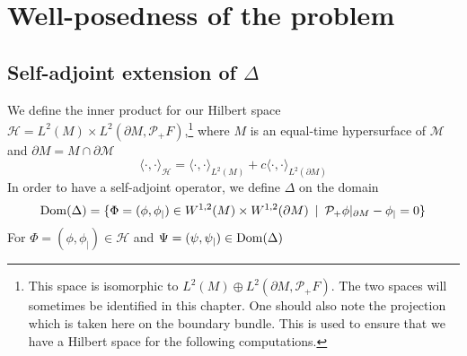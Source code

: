 \section{Well-posedness of the problem}\label{wen-sect-saw}
\subsection{Self-adjoint extension of $\Delta$}
We define the inner product for our Hilbert space $\mathcal{H} = L^{2}(M)\times L^{2}(\partial M, \mathcal{P}_+ F)$,\footnote{
This space is isomorphic to 
$L^2(M)\oplus L^2(\partial M, \mathcal{P}_+ F)$.
The two spaces will sometimes be identified in this chapter.
One should also note the projection which is taken here on the boundary bundle.
This is used to ensure that we have a Hilbert space for the following computations.
}
where $M$ is an equal-time hypersurface of $\mathcal{M}$ and $\partial M = M\cap \partial \mathcal{M}$
\begin{equation}\label{wen-innerpdt}
\langle \cdot, \cdot \rangle _\mathcal{H} = \langle \cdot, \cdot \rangle _{L^2(M)} + c \langle \cdot, \cdot \rangle _{L^2(\partial M)}
\end{equation}
In order to have a self-adjoint operator, we define $\Delta$ on the domain
\begin{equation*}
\mathrm{Dom}( \Delta) = \{ \Phi = (\phi, \phi_|) \in W^{1,2}(M)\times W^{1,2}(
\partial M)\enskip | \enskip \mathcal{P}_+\phi \vert_{\partial M} - \phi_| = 0 \}
\end{equation*}  
For $\Phi = (\phi, \phi_|) \in \mathcal{H}$ and $ \Psi = (\psi, \psi_|)\in\mathrm{Dom}(\Delta)$
